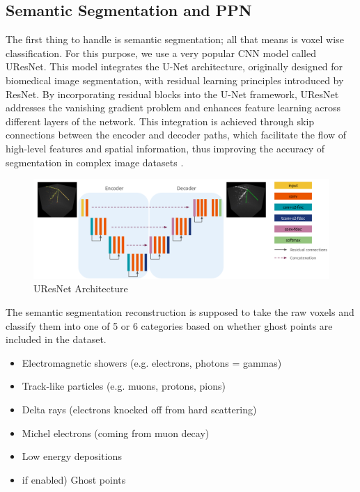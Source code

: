 \subsection{Semantic Segmentation and PPN}

The first thing to handle is semantic segmentation; all that means is  voxel wise classification.
For this purpose, we use a very popular CNN model called UResNet.
This model integrates the U-Net architecture, originally designed for biomedical image segmentation, with residual learning principles introduced by ResNet.
By incorporating residual blocks into the U-Net framework, UResNet addresses the vanishing gradient problem and enhances feature learning across different layers of the network.
This integration is achieved through skip connections between the encoder and decoder paths, which facilitate the flow of high-level features and spatial information, thus improving the accuracy of segmentation in complex image datasets \cite{uresnet_2019}.

\begin{figure}[H]
  \centering
  \includegraphics[width=120mm]{figures/uresnet.png}
  \caption{UResNet Architecture \cite{Drielsma_2024}}
  \label{uresnet}
\end{figure}

The semantic segmentation reconstruction is supposed to take the raw voxels and classify them into one of 5 or 6 categories based on whether ghost points are included in the dataset.

\begin{itemize}
\item Electromagnetic showers (e.g. electrons, photons = gammas)

\item Track-like particles (e.g. muons, protons, pions)

\item Delta rays (electrons knocked off from hard scattering)

\item Michel electrons (coming from muon decay)

\item Low energy depositions

\item if enabled) Ghost points

\end{itemize}

